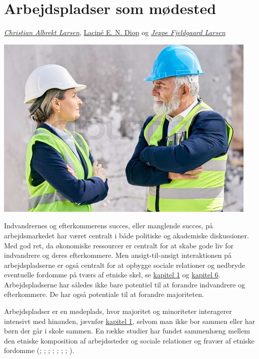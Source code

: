 \documentclass[
]{book}
\begin{document}
\chapter{Arbejdspladser som mødested}\label{kap5}

\emph{\href{https://vbn.aau.dk/en/persons/albrekt}{Christian Albrekt Larsen}}, \href{https://vbn.aau.dk/en/persons/led}{Laciné E. N. Diop} og \emph{\href{https://vbn.aau.dk/da/persons/jeppefl}{Jeppe Fjeldgaard Larsen}}

\includegraphics[width=1\linewidth]{images/kap5}

Indvandrernes og efterkommerens succes, eller manglende succes, på arbejdsmarkedet har været centralt i både politiske og akademiske diskussioner. Med god ret, da økonomiske ressourcer er centralt for at skabe gode liv for indvandrere og deres efterkommere. Men ansigt-til-ansigt interaktionen på arbejdspladserne er også centralt for at opbygge sociale relationer og nedbryde eventuelle fordomme på tværs af etniske skel, se \hyperref[kap1]{kapitel 1} og \hyperref[kap6]{kapitel 6}. Arbejdspladserne har således ikke bare potentiel til at forandre indvandrere og efterkommere. De har også potentiale til at forandre majoriteten.

Arbejdspladser er en mødeplads, hvor majoritet og minoriteter interagerer intensivt med hinanden, jævnfør \hyperref[kap1]{kapitel 1}, selvom man ikke bor sammen eller har børn der går i skole sammen. En række studier har fundet sammenhæng mellem den etniske komposition af arbejdssteder og sociale relationer og fravær af etniske fordomme (; ; ; ; ; ; ; ).
\end{document}
